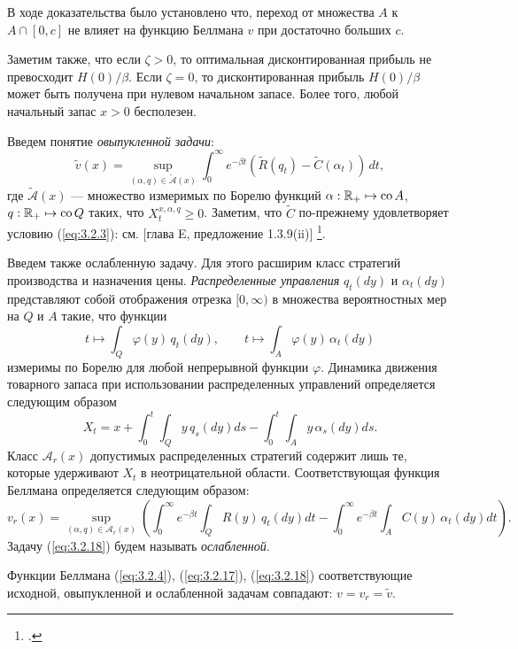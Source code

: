 \documentclass[twoside,12pt]{article}
\begin{document}
В ходе доказательства было установлено что, переход от множества $A$ к $A\cap [0,c]$ не влияет на функцию Беллмана $v$ при достаточно больших $c$.

Заметим также, что если $\zeta>0$, то оптимальная дисконтированная прибыль не превосходит $H(0)/\beta$. Если $\zeta=0$, то дисконтированная прибыль $H(0)/\beta$ может быть получена при нулевом начальном запасе. Более того, любой начальный запас $x>0$ бесполезен.

Введем понятие \emph{овыпукленной задачи}:
\begin{equation} \label{eq:3.2.17}
\widetilde v(x)=\sup_{(\alpha,q)\in\widetilde{\mathscr A}(x)}\int_0^\infty e^{-\beta t}(\widetilde R(q_t)-\widetilde C(\alpha_t))\,dt,
\end{equation}
где $\widetilde{\mathscr A}(x)$ --- множество измеримых по Борелю функций $\alpha:\mathbb R_+\mapsto{\rm co\,} A$, $q:\mathbb R_+\mapsto {\rm co\,} Q$ таких, что $X_t^{x,\alpha,q}\ge 0$. Заметим, что $\widetilde C$ по-прежнему удовлетворяет условию (\ref{eq:3.2.3}): см. [глава E, предложение 1.3.9(ii)] \footcite{HirUrrLem01}.

Введем также ослабленную задачу. Для этого расширим класс стратегий производства и назначения цены. \emph{Распределенные управления} $q_t(dy)$ и $\alpha_t(dy)$ представляют собой отображения отрезка $[0,\infty)$ в множества вероятностных мер на $Q$ и $A$ такие, что функции
$$ t\mapsto\int_Q\varphi(y)\,q_t(dy),\qquad t\mapsto\int_A\varphi(y)\,\alpha_t(dy)$$
измеримы по Борелю для любой непрерывной функции $\varphi$. Динамика движения товарного запаса при использовании распределенных управлений определяется следующим образом
$$ X_t=x+\int_0^t\int_Q y\,q_s(dy)ds-\int_0^t\int_A y\,\alpha_s(dy)ds.$$
Класс $\mathscr A_r(x)$ допустимых распределенных стратегий содержит лишь те, которые удерживают $X_t$ в неотрицательной области. Соответствующая функция Беллмана определяется следующим образом:
\begin{equation} \label{eq:3.2.18}
v_r(x)=\sup_{(\alpha,q)\in\mathscr A_r(x)}\left(\int_0^\infty e^{-\beta t}\int_Q R(y)\,q_t(dy)dt -\int_0^\infty e^{-\beta t} \int_A C(y)\,\alpha_t(dy)dt\right).
\end{equation}
Задачу (\ref{eq:3.2.18}) будем называть \emph{ослабленной}.

\begin{theorem} \label{th:3.2}
Функции Беллмана (\ref{eq:3.2.4}), (\ref{eq:3.2.17}), (\ref{eq:3.2.18}) соответствующие исходной, овыпукленной и ослабленной задачам совпадают:
$v=v_r=\widetilde v.$
\end{theorem}
\end{document}
